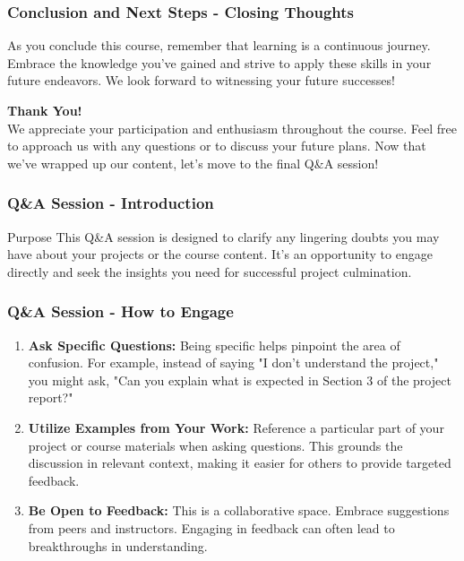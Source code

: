 \documentclass[aspectratio=169]{beamer}
\begin{document}
\begin{frame}[fragile]
    \frametitle{Conclusion and Next Steps - Closing Thoughts}
    As you conclude this course, remember that learning is a continuous journey. Embrace the knowledge you've gained and strive to apply these skills in your future endeavors. We look forward to witnessing your future successes!
    
    \vfill
    \textbf{Thank You!} \\
    We appreciate your participation and enthusiasm throughout the course. Feel free to approach us with any questions or to discuss your future plans. Now that we’ve wrapped up our content, let’s move to the final Q\&A session!
\end{frame}

\begin{frame}[fragile]
    \frametitle{Q\&A Session - Introduction}
    \begin{block}{Purpose}
        This Q\&A session is designed to clarify any lingering doubts you may have about your projects or the course content. It’s an opportunity to engage directly and seek the insights you need for successful project culmination.
    \end{block}
\end{frame}

\begin{frame}[fragile]
    \frametitle{Q\&A Session - How to Engage}
    \begin{enumerate}
        \item \textbf{Ask Specific Questions:} 
        Being specific helps pinpoint the area of confusion. For example, instead of saying "I don't understand the project," you might ask, "Can you explain what is expected in Section 3 of the project report?"
        
        \item \textbf{Utilize Examples from Your Work:} 
        Reference a particular part of your project or course materials when asking questions. This grounds the discussion in relevant context, making it easier for others to provide targeted feedback.
        
        \item \textbf{Be Open to Feedback:} 
        This is a collaborative space. Embrace suggestions from peers and instructors. Engaging in feedback can often lead to breakthroughs in understanding.
    \end{enumerate}
\end{frame}
\end{document}
